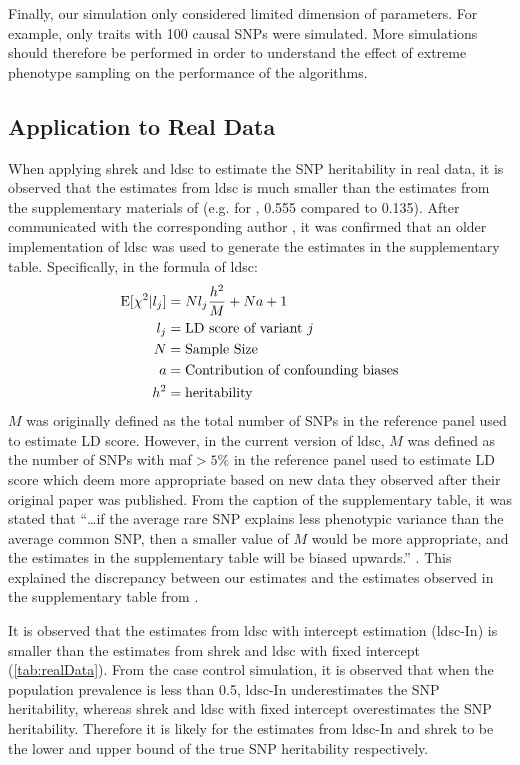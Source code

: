 	Finally, our simulation only considered limited dimension of parameters. 
	For example, only traits with 100 causal \glspl{SNP} were simulated. 
	More simulations should therefore be performed in order to understand the effect of extreme phenotype sampling on the performance of the algorithms. 
	
	\subsection{Application to Real Data}
	When applying \gls{shrek} and \gls{ldsc} to estimate the \gls{SNP} heritability in real data, it is observed that the estimates from \gls{ldsc} is much smaller than the estimates from the supplementary materials of \citet{Bulik-Sullivan2015} (e.g. for , 0.555 compared to 0.135).
	After communicated with the corresponding author \citep{Bulik-Sullivan2015c}, it was confirmed that an older implementation of \gls{ldsc} was used to generate the estimates in the supplementary table.
	Specifically, in the formula of \gls{ldsc}:
	\begin{align}
		\mathrm{E}[\chi^2|l_j] &= Nl_j\frac{h^2}{M}+Na+1 \\
		l_j &= \text{LD score of variant}\ j \notag\\
		N &= \text{Sample Size}\notag\\
		a &= \text{Contribution of confounding biases}\notag\\
		h^2 &= \text{heritability}\notag 
	\end{align}
	$M$ was originally defined as the total number of \glspl{SNP} in the reference panel used to estimate \gls{LD} score.	
	However, in the current version of \gls{ldsc}, $M$ was defined as the number of \glspl{SNP} with \gls{maf}$ >5\%$ in the reference panel used to estimate \gls{LD} score which \citet{Bulik-Sullivan2015} deem more appropriate based on new data they observed after their original paper was published.
	From the caption of the supplementary table, it was stated that ``\dots if the average rare \gls{SNP} explains less phenotypic variance than the average common \gls{SNP}, then a smaller value of $M$ would be more appropriate, and the estimates in the supplementary table will be biased upwards.'' \citep{Bulik-Sullivan2015}.
	This explained the discrepancy between our estimates and the estimates observed in the supplementary table from \citet{Bulik-Sullivan2015}.
	
	It is observed that the estimates from \gls{ldsc} with intercept estimation (\gls{ldsc}-In) is smaller than the estimates from \gls{shrek} and \gls{ldsc} with fixed intercept (\cref{tab:realData}).
	From the case control simulation, it is observed that when the population prevalence is less than 0.5, \gls{ldsc}-In underestimates the \gls{SNP} heritability, whereas \gls{shrek} and \gls{ldsc} with fixed intercept overestimates the \gls{SNP} heritability.
	Therefore it is likely for the estimates from \gls{ldsc}-In and \gls{shrek} to be the lower and upper bound of the true \gls{SNP} heritability respectively. 

